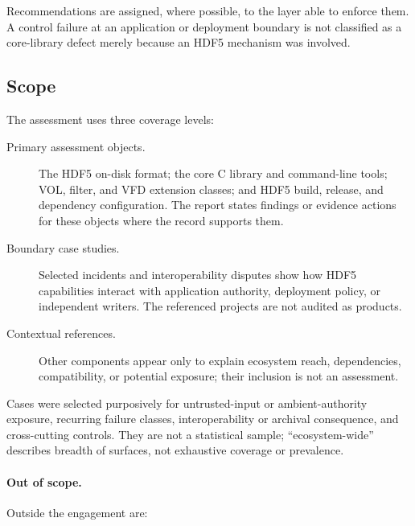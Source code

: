 \documentclass[../main.tex]{subfiles}
\begin{document}
Recommendations are assigned, where possible, to the layer able to enforce
them. A control failure at an application or deployment boundary is not
classified as a core-library defect merely because an HDF5 mechanism was
involved.

\subsection{Scope}
\label{sec:assessment-scope}

The assessment uses three coverage levels:

\begin{description}
    \item[Primary assessment objects.]
    The HDF5 on-disk format; the core C library and command-line tools; VOL,
    filter, and VFD extension classes; and HDF5 build, release, and dependency
    configuration. The report states findings or evidence actions for these
    objects where the record supports them.

    \item[Boundary case studies.]
    Selected incidents and interoperability disputes show how HDF5 capabilities
    interact with application authority, deployment policy, or independent
    writers. The referenced projects are not audited as products.

    \item[Contextual references.]
    Other components appear only to explain ecosystem reach, dependencies,
    compatibility, or potential exposure; their inclusion is not an assessment.
\end{description}

Cases were selected purposively for untrusted-input or ambient-authority
exposure, recurring failure classes, interoperability or archival consequence,
and cross-cutting controls. They are not a statistical sample; ``ecosystem-wide''
describes breadth of surfaces, not exhaustive coverage or prevalence.

\paragraph{Out of scope.}
Outside the engagement are:
\end{document}
